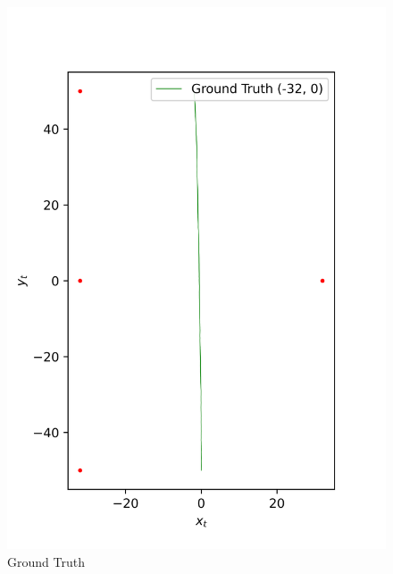 \begin{figure}[H]
    \centering
    \begin{minipage}{0.49\linewidth}
        \centering
        \includegraphics[width=\linewidth]{plots/part2-f-2-GT.png}
        \caption*{Ground Truth}
    \end{minipage}
    \hfill
    \begin{minipage}{0.49\linewidth}
        \centering

\end{minipage}
\end{figure}
